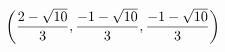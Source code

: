 \documentclass[preview]{standalone}
\begin{document}
\begin{align*}
\special{dvisvgm:raw <g id='unique000'>}\left(\dfrac{2-\sqrt{10}}{3},\dfrac{-1-\sqrt{10}}{3},\dfrac{-1-\sqrt{10}}{3}\right)\special{dvisvgm:raw </g>}
\end{align*}
\end{document}
